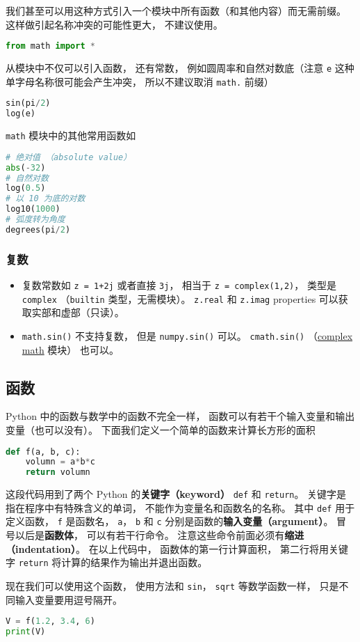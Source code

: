 我们甚至可以用这种方式引入一个模块中所有函数（和其他内容）而无需前缀。 这样做引起名称冲突的可能性更大， 不建议使用。
\begin{lstlisting}[language=python]
from math import *
\end{lstlisting}
从模块中不仅可以引入函数， 还有常数， 例如圆周率和自然对数底（注意 \verb|e| 这种单字母名称很可能会产生冲突， 所以不建议取消 \verb|math.| 前缀）
\begin{lstlisting}[language=python]
sin(pi/2)
log(e)
\end{lstlisting}

\verb|math| 模块中的其他常用函数如
\begin{lstlisting}[language=python]
# 绝对值 （absolute value）
abs(-32)
# 自然对数
log(0.5)
# 以 10 为底的对数
log10(1000)
# 弧度转为角度
degrees(pi/2)
\end{lstlisting}

\subsubsection{复数}
\begin{itemize}
\item 复数常数如 \verb|z = 1+2j| 或者直接 \verb|3j|， 相当于 \verb|z = complex(1,2)|， 类型是 \verb|complex| （\verb|builtin| 类型，无需模块）。 \verb|z.real| 和 \verb|z.imag| properties 可以获取实部和虚部（只读）。
\item \verb|math.sin()| 不支持复数， 但是 \verb|numpy.sin()| 可以。 \verb|cmath.sin()| （\href{https://docs.python.org/3/library/cmath.html}{complex math} 模块） 也可以。
\end{itemize}

\subsection{函数}
Python 中的函数与数学中的函数不完全一样， 函数可以有若干个输入变量和输出变量（也可以没有）。 下面我们定义一个简单的函数来计算长方形的面积
\begin{lstlisting}[language=python]
def f(a, b, c):
    volumn = a*b*c
    return volumn
\end{lstlisting}
这段代码用到了两个 Python 的\textbf{关键字（keyword）} \verb|def| 和 \verb|return|。 关键字是指在程序中有特殊含义的单词， 不能作为变量名和函数名的名称。 其中 \verb|def| 用于定义函数， \verb|f| 是函数名， \verb|a|， \verb|b| 和 \verb|c| 分别是函数的\textbf{输入变量（argument）}。 冒号以后是\textbf{函数体}， 可以有若干行命令。 注意这些命令前面必须有\textbf{缩进（indentation）}。  在以上代码中， 函数体的第一行计算面积， 第二行将用关键字 \verb|return| 将计算的结果作为输出并退出函数。

现在我们可以使用这个函数， 使用方法和 \verb|sin|， \verb|sqrt| 等数学函数一样， 只是不同输入变量要用逗号隔开。
\begin{lstlisting}[language=python]
V = f(1.2, 3.4, 6)
print(V)
\end{lstlisting}
